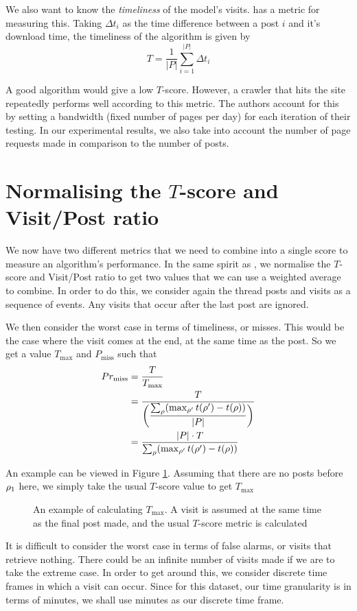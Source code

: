 We also want to know the \emph{timeliness} of the model's visits.  
 has a metric for measuring this. Taking $\Delta t_i$ as the 
time difference between a post $i$ and it's download time, the timeliness of the 
algorithm is given by
\[
	T = \frac{1}{|P|} \sum^{|P|}_{i=1}\Delta t_i
\]

A good algorithm would give a low $T$-score. However, a crawler that hits the 
site repeatedly performs well according to this metric. The authors account for 
this by setting a bandwidth (fixed number of pages per day) for each iteration 
of their testing. In our experimental results, we also take into account the 
number of page requests made in comparison to the number of posts. %


\section{Normalising the $T$-score and Visit/Post ratio}
We now have two different metrics that we need to combine into a single score to 
measure an algorithm's performance. In the same spirit as 
, we normalise the $T$-score and Visit/Post ratio to get 
two values that we can use a weighted average to combine. In order to do this, 
we consider again the thread posts and visits as a sequence of events. Any 
visits that occur after the last post are ignored.

We then consider the worst case in terms of timeliness, or misses. This would be 
the case where the visit comes at the end, at the same time as the post. So we 
get a value $T_{\max}$ and $P_{\text{miss}}$ such that
\begin{align*}
	\P_{\text{miss}} &= \frac{T}{T_{\max}}\\
							  &= \dfrac{T}{\left(
					\dfrac{%
			\sum_\post (\max_{\post'}t(\post') - t(\post))}{|P|}\right)} \\
					&= \dfrac{|P| \cdot T}{%
		\sum_\post (\max_{\post'}t(\post') - t(\post))}
\end{align*}


An example can be viewed in Figure \ref{fig:norm_t_score}. Assuming that there 
are no posts before $\rho_1$ here, we simply take the usual $T$-score value to 
get $T_\text{max}$
\begin{figure}
\begin{center}

	\end{center}
\caption{An example of calculating $T_\text{max}$. A visit is assumed at the 
same time as the final post made, and the usual $T$-score metric is 
calculated}\label{fig:norm_t_score}
\end{figure}
It is difficult to consider the worst case in terms of false alarms, or visits 
that retrieve nothing. There could be an infinite number of visits made if we 
are to take the extreme case. In order to get around this, we consider discrete 
time frames in which a visit can occur. Since for this dataset, our time 
granularity is in terms of minutes, we shall use minutes as our discrete time 
frame.

